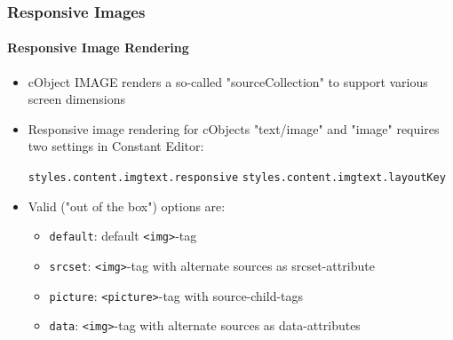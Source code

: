 \begin{frame}[fragile]
	\frametitle{Responsive Images}
	\framesubtitle{Responsive Image Rendering}

	\begin{itemize}
		\item cObject IMAGE renders a so-called "sourceCollection" to support various screen dimensions
		\item Responsive image rendering for cObjects "text/image" and "image" requires two settings in Constant Editor:

			\texttt{styles.content.imgtext.responsive}\newline
			\texttt{styles.content.imgtext.layoutKey}

		\item Valid ("out of the box") options are:

			\begin{itemize}
				\item \texttt{default}:	\tabto{2cm} default \texttt{<img>}-tag
				\item \texttt{srcset}:	\tabto{2cm} \texttt{<img>}-tag with alternate sources as srcset-attribute
				\item \texttt{picture}:	\tabto{2cm} \texttt{<picture>}-tag with source-child-tags
				\item \texttt{data}:	\tabto{2cm} \texttt{<img>}-tag with alternate sources as data-attributes
			\end{itemize}

	\end{itemize}

\end{frame}



